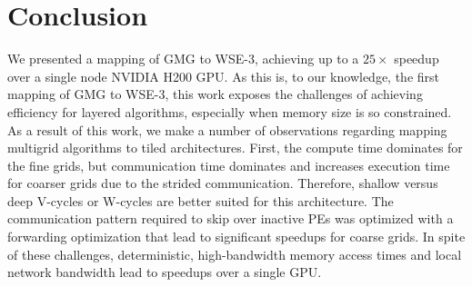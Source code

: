 \documentclass[sigconf]{acmart}
\begin{document}
\section{Conclusion}
We presented a mapping of GMG to WSE-3, achieving up to a $25\times$ speedup over a single node NVIDIA H200 GPU.  As this is, to our knowledge, the first mapping of GMG to WSE-3, this work exposes the challenges of achieving efficiency for layered algorithms, especially when memory size is so constrained. As a result of this work, we make a number of observations regarding mapping multigrid algorithms to tiled architectures.  First, the compute time dominates for the fine grids, but communication time dominates and increases execution time for coarser grids due to the strided communication.  Therefore, shallow versus deep V-cycles or W-cycles are better suited for this architecture. The communication pattern required to skip over inactive PEs was optimized with a forwarding optimization that lead to significant speedups for coarse grids.
In spite of these challenges, deterministic, high-bandwidth memory access times and local network bandwidth lead to speedups over a single GPU.
\end{document}

